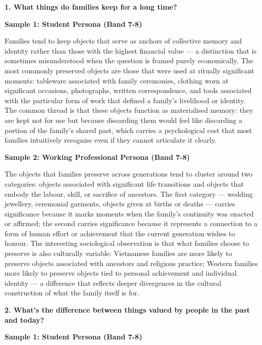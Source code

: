 \partthreeheader

\begin{ieltsquestion}
\textbf{1. What things do families keep for a long time?}
\end{ieltsquestion}
\textbf{Sample 1: Student Persona (Band 7-8)}

Families tend to keep objects that serve as anchors of collective memory and identity rather than those with the highest financial value — a distinction that is sometimes misunderstood when the question is framed purely economically. The most commonly preserved objects are those that were used at ritually significant moments: tableware associated with family ceremonies, clothing worn at significant occasions, photographs, written correspondence, and tools associated with the particular form of work that defined a family's livelihood or identity. The common thread is that these objects function as materialised memory: they are kept not for use but because discarding them would feel like discarding a portion of the family's shared past, which carries a psychological cost that most families intuitively recognise even if they cannot articulate it clearly.

\textbf{Sample 2: Working Professional Persona (Band 7-8)}

The objects that families preserve across generations tend to cluster around two categories: objects associated with significant life transitions and objects that embody the labour, skill, or sacrifice of ancestors. The first category — wedding jewellery, ceremonial garments, objects given at births or deaths — carries significance because it marks moments when the family's continuity was enacted or affirmed; the second carries significance because it represents a connection to a form of human effort or achievement that the current generation wishes to honour. The interesting sociological observation is that what families choose to preserve is also culturally variable: Vietnamese families are more likely to preserve objects associated with ancestors and religious practice; Western families more likely to preserve objects tied to personal achievement and individual identity — a difference that reflects deeper divergences in the cultural construction of what the family itself is for.

\separator

\begin{ieltsquestion}
\textbf{2. What's the difference between things valued by people in the past and today?}
\end{ieltsquestion}
\textbf{Sample 1: Student Persona (Band 7-8)}

